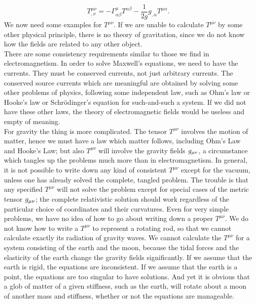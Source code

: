 \begin{equation}
T^{\mu \nu}_{,\nu} = - \Gamma^\mu_{\alpha \beta} T^{\alpha \beta} - \frac{1}{2 g} g_{, \alpha} T^{\mu \alpha}.
\end{equation}
We now need some examples for $T^{\mu\nu}$. If we are unable to calculate $T^{\mu \nu}$ by some other physical principle, there is no theory of gravitation, since we do not know how the fields are related to any other object.
\\
There are some consistency requirements similar to those we find in electromagnetism. In order to solve Maxwell's equations, we need to have the currents. They must be conserved currents, not just arbitrary currents. The conserved source currents which are meaningful are obtained by solving some other problems of physics, following some independent law, such as Ohm's law or Hooke's law or Schrödinger's equation for such-and-such a system. If we did not have these other laws, the theory of electromagnetic fields would be useless and empty of meaning.\\
For gravity the thing is more complicated. The tensor $T^{\mu \nu}$ involves the motion of matter, hence we must have a law which matter follows, including Ohm's Law and Hooke's Law; but also $T^{\mu \nu}$ will involve the gravity fields $g_{\mu \nu}$, a circumstance which tangles up the problems much more than in electromagnetism. In general, it is not possible to write down any kind of consistent $T^{\mu \nu}$ except for the vacuum, unless one has already solved the complete, tangled problem. The trouble is that any specified $T^{\mu \nu}$ will not solve the problem except for special cases of the metric tensor $g_{\mu \nu}$; the complete relativistic solution should work regardless of the particular choice of coordinates and their curvatures. Even for very simple problems, we have no idea of how to go about writing down a proper $T^{\mu \nu}$. We do not know how to write a $T^{\mu \nu}$ to represent a rotating rod, so that we cannot calculate exactly its radiation of gravity waves. We cannot calculate the $T^{\mu \nu}$ for a system consisting of the earth and the moon, because the tidal forces and the elasticity of the earth change the gravity fields significantly. If we assume that the earth is rigid, the equations are inconsistent. If we assume that the earth is a point, the equations are too singular to have solutions. And yet it is obvious that a glob of matter of a given stiffness, such as the earth, will rotate about a moon of another mass and stiffness, whether or not the equations are manageable.\\
